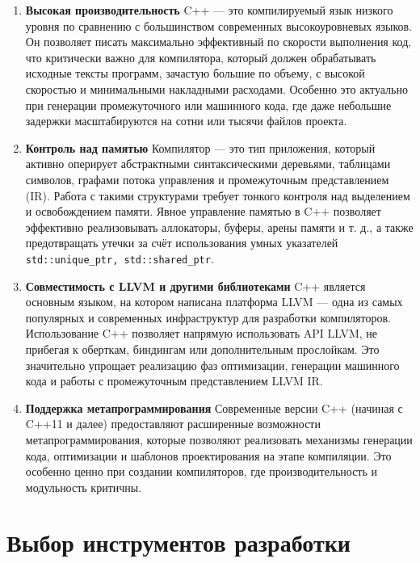 \begin{enumerate}
	\item \textbf{Высокая производительность}
	C++ — это компилируемый язык низкого уровня по сравнению с большинством современных высокоуровневых языков. 
	Он позволяет писать максимально эффективный по скорости выполнения код, что критически важно для компилятора, который должен обрабатывать исходные тексты программ, зачастую большие по объему, с высокой скоростью и минимальными накладными расходами. 
	Особенно это актуально при генерации промежуточного или машинного кода, где даже небольшие задержки масштабируются на сотни или тысячи файлов проекта.

	\item \textbf{Контроль над памятью}
	Компилятор — это тип приложения, который активно оперирует абстрактными синтаксическими деревьями, таблицами символов, графами потока управления и промежуточным представлением (IR). 
	Работа с такими структурами требует тонкого контроля над выделением и освобождением памяти. Явное управление памятью в C++ позволяет эффективно реализовывать аллокаторы, буферы, арены памяти и т. д., а также предотвращать утечки за счёт использования умных указателей \texttt{std::unique\_ptr, std::shared\_ptr}.

	\item \textbf{Совместимость с LLVM и другими библиотеками}
	C++ является основным языком, на котором написана платформа LLVM — одна из самых популярных и современных инфраструктур для разработки компиляторов. 
	Использование C++ позволяет напрямую использовать API LLVM, не прибегая к оберткам, биндингам или дополнительным прослойкам. 
	Это значительно упрощает реализацию фаз оптимизации, генерации машинного кода и работы с промежуточным представлением LLVM IR.

	\item \textbf{Поддержка метапрограммирования}
	Современные версии C++ (начиная с C++11 и далее) предоставляют расширенные возможности метапрограммирования, которые позволяют реализовать механизмы генерации кода, оптимизации и шаблонов проектирования на этапе компиляции. 
	Это особенно ценно при создании компиляторов, где производительность и модульность критичны.

\end{enumerate}

\section{Выбор инструментов разработки}

